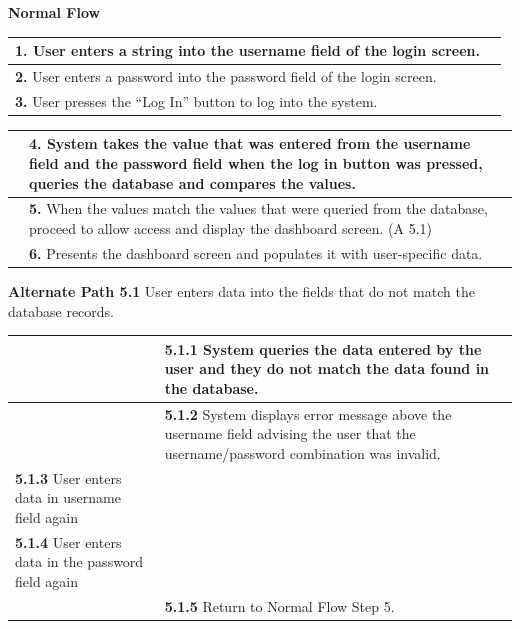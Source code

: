 \documentclass[letterpaper,12pt]{report}
\begin{document}
{
\centering \textbf{Normal Flow}

\begin{center}
\xuchead
\begin{tabular}{| p{8.5cm} | p{8.5cm} |}
\hline
\textbf{1.} User enters a string into the username field of the login screen. & \\
\hline
\textbf{2.} User enters a password into the password field of the login screen. & \\
\hline
\textbf{3.} User presses the ``Log In'' button to log into the system\index{system}. & \\
\hline
\end{tabular}

\end{center}
\pagebreak

\xuchead
\begin{tabular}{| p{8.5cm} | p{8.5cm} |}
\hline
& \textbf{4.} System\index{system} takes the value that was entered from the username field and the password field when the log in button was pressed, queries the database\index{Database} and compares the values. \\
\hline
& \textbf{5.} When the values match the values that were queried from the database, proceed to allow access and display the dashboard screen. (A 5.1) \\
\hline
& \textbf{6.} Presents the dashboard screen and populates it with user-specific data. \\
\hline
\end{tabular}



\centering \textbf{Alternate Path 5.1} \linebreak
User enters data into the fields that do not match the database records. 

\begin{center}
\xuchead
\begin{tabular}{| p{8.5cm} | p{8.5cm} |}
\hline
& \textbf{5.1.1} System\index{system} queries the data entered by the user and they do not match the data found in the database. \\
\hline
& \textbf{5.1.2} System displays error message above the username field advising the user that the username/password combination was invalid. \\
\hline
\textbf{5.1.3} User enters data in username field again & \\
\hline
\textbf{5.1.4} User enters data in the password field again & \\
\hline
& \textbf{5.1.5} Return to Normal Flow Step 5. \\
\hline
\end{tabular}
\end{center}
\pagebreak
}
\end{document}
